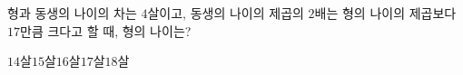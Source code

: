 형과 동생의 나이의 차는 $4$살이고, 동생의 나이의 제곱의 $2$배는 형의 나이의 제곱보다 $17$만큼 크다고 할 때, 형의 나이는?
\begin{choices32}{$14$살}{$15$살}{$16$살}{$17$살}{$18$살}\end{choices32}
